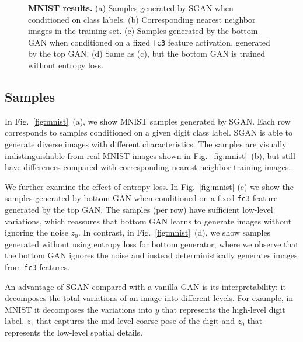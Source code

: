 \documentclass[10pt,twocolumn,letterpaper]{article}
\begin{document}
\begin{figure}[!htbp]
	\caption{{\bf MNIST results.} 
(a) Samples generated by SGAN when conditioned on class labels. (b) Corresponding nearest neighbor images in the training set. (c) Samples generated by the bottom GAN when conditioned on a fixed \texttt{fc3} feature activation, generated by the top GAN. (d) Same as (c), but the bottom GAN is trained without entropy loss.} 
 	\label{fig:cifar}
 	 \vspace{-0.2cm}
 \end{figure}
 
\subsection{Samples}
\label{samples}

In Fig.~\ref{fig:mnist}~(a), we show MNIST samples generated by SGAN. Each row corresponds to samples conditioned on a given digit class label. SGAN is able to generate diverse images with different characteristics. The samples are visually indistinguishable from real MNIST images shown in Fig.~\ref{fig:mnist}~(b), but still have differences compared with corresponding nearest neighbor training images. 

We further examine the effect of entropy loss. In Fig.~\ref{fig:mnist} (c) we show the samples generated by bottom GAN when conditioned on a fixed \texttt{fc3} feature generated by the top GAN. %
The samples (per row) have sufficient low-level variations, which reassures that bottom GAN learns to generate images without ignoring the noise $z_0$. 
In contrast, in Fig.~\ref{fig:mnist}~(d), we show samples generated without using entropy loss for bottom generator, where we observe that the bottom GAN ignores the noise and instead deterministically generates images from \texttt{fc3} features. 

An advantage of SGAN compared with a vanilla GAN is its interpretability: it decomposes the total variations of an image into different levels. For example, in MNIST it decomposes the variations into $y$ that represents the high-level digit label, $z_{1}$ that captures the mid-level coarse pose of the digit and $z_{0}$ that represents the low-level spatial details. %
\end{document}
